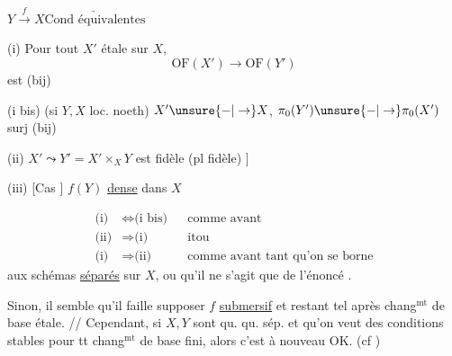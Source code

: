 $Y\xrightarrow{f}X$\qquad $\underrightarrow{\text{Cond équivalentes}}$

(i) Pour tout $X'$ étale sur $X$,
\[
\mathrm{OF}(X')\longrightarrow\mathrm{OF}(Y')
\]
est  (bij)

(i bis) (si $Y,X$ loc. noeth) $X'\unsure{-|\to}X$, $\pi_0(Y')\unsure{-|\to}\pi_0(X')$ surj (bij)

(ii) $X'\leadsto Y'=X'\times_X Y$ est fidèle (pl fidèle) $\big]$ 

(iii) [Cas  ] $f(Y)$ \uline{dense} dans $X$

\[
\begin{aligned}
\text{(i)}&\Leftrightarrow\text{(i bis)}&&\text{comme avant}\\
\text{(ii)}&\Longrightarrow\text{(i)}&&\text{itou}\\
\text{(i)}&\Longrightarrow\text{(ii)}&&\text{comme avant tant qu'on se borne}
\end{aligned}
\]
aux schémas \uline{séparés} sur $X$, ou qu'il ne s'agit que de l'énoncé .

Sinon, il semble qu'il faille supposer $f$ \uline{submersif} et restant tel après chang$^{\mathrm{mt}}$ de base étale. // Cependant, si $X,Y$ sont qu.  qu. sép. et qu'on veut des conditions stables pour tt chang$^{\mathrm{mt}}$ de base fini, alors c'est à nouveau OK. (cf )
